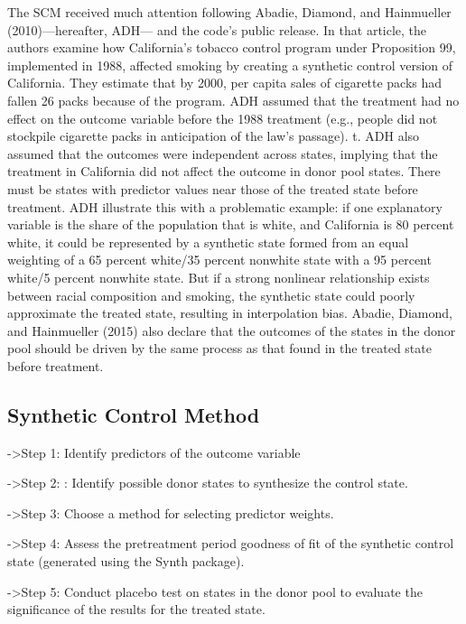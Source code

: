 \documentclass[
]{article}
\begin{document}
The SCM received much attention following Abadie, Diamond, and
Hainmueller (2010)---hereafter, ADH--- and the code's public release. In
that article, the authors examine how California's tobacco control
program under Proposition 99, implemented in 1988, affected smoking by
creating a synthetic control version of California. They estimate that
by 2000, per capita sales of cigarette packs had fallen 26 packs because
of the program. ADH assumed that the treatment had no effect on the
outcome variable before the 1988 treatment (e.g., people did not
stockpile cigarette packs in anticipation of the law's passage). t. ADH
also assumed that the outcomes were independent across states, implying
that the treatment in California did not affect the outcome in donor
pool states. There must be states with predictor values near those of
the treated state before treatment. ADH illustrate this with a
problematic example: if one explanatory variable is the share of the
population that is white, and California is 80 percent white, it could
be represented by a synthetic state formed from an equal weighting of a
65 percent white/35 percent nonwhite state with a 95 percent white/5
percent nonwhite state. But if a strong nonlinear relationship exists
between racial composition and smoking, the synthetic state could poorly
approximate the treated state, resulting in interpolation bias. Abadie,
Diamond, and Hainmueller (2015) also declare that the outcomes of the
states in the donor pool should be driven by the same process as that
found in the treated state before treatment.

\newpage

\hypertarget{synthetic-control-method}{%
\subsection{\texorpdfstring{\textbf{Synthetic Control
Method}}{Synthetic Control Method}}\label{synthetic-control-method}}

-\textgreater Step 1: Identify predictors of the outcome variable

-\textgreater Step 2: : Identify possible donor states to synthesize the
control state.

-\textgreater Step 3: Choose a method for selecting predictor weights.

-\textgreater Step 4: Assess the pretreatment period goodness of fit of
the synthetic control state (generated using the Synth package).

-\textgreater Step 5: Conduct placebo test on states in the donor pool
to evaluate the significance of the results for the treated state.
\end{document}
